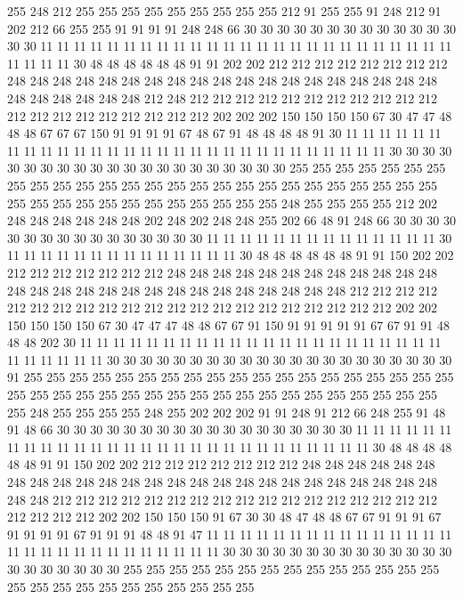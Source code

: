 255 248 212 255 255 255 255 255 255 255 255 255 212 91 255 255 91 248 212 91
202 212 66 255 255 91 91 91 91 248 248 66 30 30 30 30 30 30 30 30
30 30 30 30 30 30 30 11 11 11 11 11 11 11 11 11 11 11 11 11
11 11 11 11 11 11 11 11 11 11 11 11 11 11 11 11 30 48 48 48
48 48 48 91 91 202 202 212 212 212 212 212 212 212 212 248 248 248 248 248
248 248 248 248 248 248 248 248 248 248 248 248 248 248 248 248 248 248 248 248
212 248 212 212 212 212 212 212 212 212 212 212 212 212 212 212 212 212 212 212
212 212 202 202 202 150 150 150 150 67 30 47 47 48 48 48 67 67 67 150
91 91 91 91 67 48 67 91 48 48 48 48 91 30 11 11 11 11 11 11
11 11 11 11 11 11 11 11 11 11 11 11 11 11 11 11 11 11 11 11
11 11 11 30 30 30 30 30 30 30 30 30 30 30 30 30 30 30 30 30
30 30 30 30 255 255 255 255 255 255 255 255 255 255 255 255 255 255 255 255
255 255 255 255 255 255 255 255 255 255 255 255 255 255 255 255 255 255 255 255
255 255 248 255 255 255 255 212 202 248 248 248 248 248 248 202 248 202 248 248
255 202 66 48 91 248 66 30 30 30 30 30 30 30 30 30 30 30 30 30
30 30 30 11 11 11 11 11 11 11 11 11 11 11 11 11 11 30 11 11
11 11 11 11 11 11 11 11 11 11 11 11 30 48 48 48 48 48 48 91
91 150 202 202 212 212 212 212 212 212 212 248 248 248 248 248 248 248 248 248
248 248 248 248 248 248 248 248 248 248 248 248 248 248 248 248 248 248 212 212
212 212 212 212 212 212 212 212 212 212 212 212 212 212 212 212 212 212 212 202
202 150 150 150 150 67 30 47 47 47 48 48 67 67 91 150 91 91 91 91
91 67 67 91 91 48 48 48 202 30 11 11 11 11 11 11 11 11 11 11
11 11 11 11 11 11 11 11 11 11 11 11 11 11 11 11 11 11 30 30
30 30 30 30 30 30 30 30 30 30 30 30 30 30 30 30 30 30 30 91
255 255 255 255 255 255 255 255 255 255 255 255 255 255 255 255 255 255 255 255
255 255 255 255 255 255 255 255 255 255 255 255 255 255 255 255 255 255 255 248
255 255 255 255 248 255 202 202 202 91 91 248 91 212 66 248 255 91 48 91
48 66 30 30 30 30 30 30 30 30 30 30 30 30 30 30 30 30 30 30
11 11 11 11 11 11 11 11 11 11 11 11 11 11 11 11 11 11 11 11
11 11 11 11 11 11 11 11 30 48 48 48 48 48 48 91 91 150 202 202
212 212 212 212 212 212 212 248 248 248 248 248 248 248 248 248 248 248 248 248
248 248 248 248 248 248 248 248 248 248 248 248 248 248 212 212 212 212 212 212
212 212 212 212 212 212 212 212 212 212 212 212 212 212 212 202 202 150 150 150
91 67 30 30 48 47 48 48 67 67 91 91 91 67 91 91 91 91 67 91
91 91 48 48 91 47 11 11 11 11 11 11 11 11 11 11 11 11 11 11
11 11 11 11 11 11 11 11 11 11 11 11 11 11 30 30 30 30 30 30
30 30 30 30 30 30 30 30 30 30 30 30 30 30 30 255 255 255 255 255
255 255 255 255 255 255 255 255 255 255 255 255 255 255 255 255 255 255 255 255
